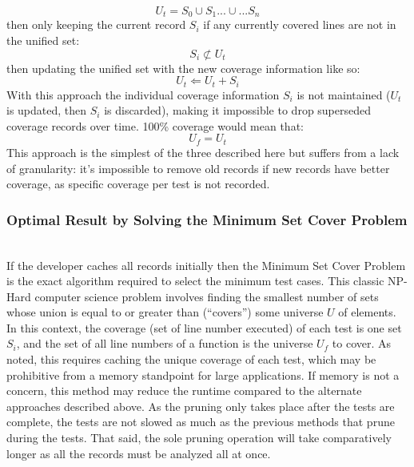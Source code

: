 \begin{equation*}
  U_t = S_0 \cup S_1 ...\cup... S_n
\end{equation*}
then only keeping the current record $S_i$ if any currently 
covered lines are not in the unified set:
\begin{equation*}
  S_i \not \subset U_t
\end{equation*}
then updating the unified set with the new coverage information like so:
\begin{equation*}
  U_t \Leftarrow U_t + S_i
\end{equation*} 
With this approach the individual coverage information $S_i$ is not maintained 
($U_t$ is updated, then $S_i$ is discarded), making it impossible to drop superseded 
coverage records over time.  100\% coverage would mean that:
\begin{equation*}
  U_f = U_t
\end{equation*} 
This approach is the simplest of the three described here but suffers from a 
lack of granularity: it's impossible to remove old records if new records have 
better coverage, as specific coverage per test is not recorded.

\subsubsection{Optimal Result by Solving the Minimum Set Cover Problem}\label{sec:tuning-2}
\hfill\\
If the developer caches all records initially then the Minimum Set Cover Problem
\cite{hassin2005better} is the exact algorithm required to select the minimum test cases.
This classic NP-Hard computer science problem involves finding the smallest number
of sets whose union is equal to or greater than (“covers”) some universe $U$ of elements.  
In this context, the coverage (set of line number executed) of each test is one set $S_i$,
and the set of all line numbers of a function is the universe $U_f$ to cover.  
As noted, this requires caching the unique coverage of each test, which may 
be prohibitive from a memory standpoint for large applications.
If memory is not a concern, this method may reduce the runtime 
compared to the alternate approaches described above.  As the pruning 
only takes place after the tests are complete, the tests are not slowed as much
as the previous methods that prune during the tests.  That said, the sole
pruning operation will take comparatively longer as all the records must be 
analyzed all at once.
   
